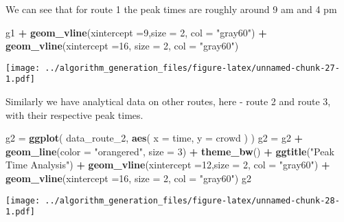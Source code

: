 \documentclass[
]{article}
\newenvironment{Shaded}{\begin{snugshade}}{\end{snugshade}}
\newcommand{\DataTypeTok}[1]{\textcolor[rgb]{0.13,0.29,0.53}{#1}}
\newcommand{\DecValTok}[1]{\textcolor[rgb]{0.00,0.00,0.81}{#1}}
\newcommand{\KeywordTok}[1]{\textcolor[rgb]{0.13,0.29,0.53}{\textbf{#1}}}
\newcommand{\NormalTok}[1]{#1}
\newcommand{\OperatorTok}[1]{\textcolor[rgb]{0.81,0.36,0.00}{\textbf{#1}}}
\newcommand{\StringTok}[1]{\textcolor[rgb]{0.31,0.60,0.02}{#1}}
\begin{document}
We can see that for route 1 the peak times are roughly around 9 am and 4
pm

\begin{Shaded}
\begin{Highlighting}[]
\NormalTok{g1 }\OperatorTok{+}\StringTok{ }\KeywordTok{geom_vline}\NormalTok{(}\DataTypeTok{xintercept =}\DecValTok{9}\NormalTok{,}\DataTypeTok{size =} \DecValTok{2}\NormalTok{, }\DataTypeTok{col =} \StringTok{"gray60"}\NormalTok{) }\OperatorTok{+}\StringTok{ }\KeywordTok{geom_vline}\NormalTok{(}\DataTypeTok{xintercept =}\DecValTok{16}\NormalTok{, }\DataTypeTok{size =} \DecValTok{2}\NormalTok{, }\DataTypeTok{col =} \StringTok{"gray60"}\NormalTok{) }
\end{Highlighting}
\end{Shaded}

\texttt{[image: ../algorithm\_generation\_files/figure-latex/unnamed-chunk-27-1.pdf]}

Similarly we have analytical data on other routes, here - route 2 and
route 3, with their respective peak times.

\begin{Shaded}
\begin{Highlighting}[]
\NormalTok{g2 =}\StringTok{ }\KeywordTok{ggplot}\NormalTok{(}
\NormalTok{  data_route_}\DecValTok{2}\NormalTok{,}
      \KeywordTok{aes}\NormalTok{(}
        \DataTypeTok{x =}\NormalTok{ time,}
        \DataTypeTok{y =}\NormalTok{ crowd}
\NormalTok{      )}
\NormalTok{) }
\NormalTok{g2 =}\StringTok{ }\NormalTok{g2 }\OperatorTok{+}\StringTok{ }\KeywordTok{geom_line}\NormalTok{(}\DataTypeTok{color =} \StringTok{"orangered"}\NormalTok{, }\DataTypeTok{size =} \DecValTok{3}\NormalTok{) }\OperatorTok{+}\StringTok{ }\KeywordTok{theme_bw}\NormalTok{() }\OperatorTok{+}\StringTok{ }\KeywordTok{ggtitle}\NormalTok{(}\StringTok{"Peak Time Analysis"}\NormalTok{) }\OperatorTok{+}\StringTok{ }\KeywordTok{geom_vline}\NormalTok{(}\DataTypeTok{xintercept =}\DecValTok{12}\NormalTok{,}\DataTypeTok{size =} \DecValTok{2}\NormalTok{, }\DataTypeTok{col =} \StringTok{"gray60"}\NormalTok{) }\OperatorTok{+}\StringTok{ }\KeywordTok{geom_vline}\NormalTok{(}\DataTypeTok{xintercept =}\DecValTok{16}\NormalTok{, }\DataTypeTok{size =} \DecValTok{2}\NormalTok{, }\DataTypeTok{col =} \StringTok{"gray60"}\NormalTok{) }
\NormalTok{g2}
\end{Highlighting}
\end{Shaded}

\texttt{[image: ../algorithm\_generation\_files/figure-latex/unnamed-chunk-28-1.pdf]}
\end{document}
